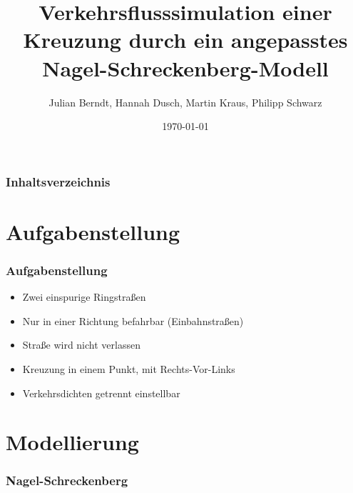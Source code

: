 \documentclass[hyperref={pdfpagelabels=false}, 12pt]{beamer}
\title{Verkehrsflusssimulation einer Kreuzung durch ein angepasstes Nagel-Schreckenberg-Modell }
\author{ Julian Berndt, Hannah Dusch, Martin Kraus, Philipp Schwarz}
\date{\today}
\begin{document}
{
\begin{titlepage}

\end{titlepage}

\begin{frame}
\frametitle{Inhaltsverzeichnis}
\tableofcontents
\end{frame} 

\section{Aufgabenstellung}
\begin{frame}
	\frametitle{Aufgabenstellung}
	\begin{itemize}
		\item Zwei einspurige Ringstraßen
		\item Nur in einer Richtung befahrbar (Einbahnstraßen)
		\item Straße wird nicht verlassen
		\item Kreuzung in einem Punkt, mit Rechts-Vor-Links
		\item Verkehrsdichten getrennt einstellbar
	\end{itemize}
\end{frame}

\section{Modellierung}
\begin{frame}
	\frametitle{Nagel-Schreckenberg}
	\begin{algorithm}[H]

 
 \label{algo:nagelsberg}
\end{algorithm}


\end{frame}}
\end{document}
